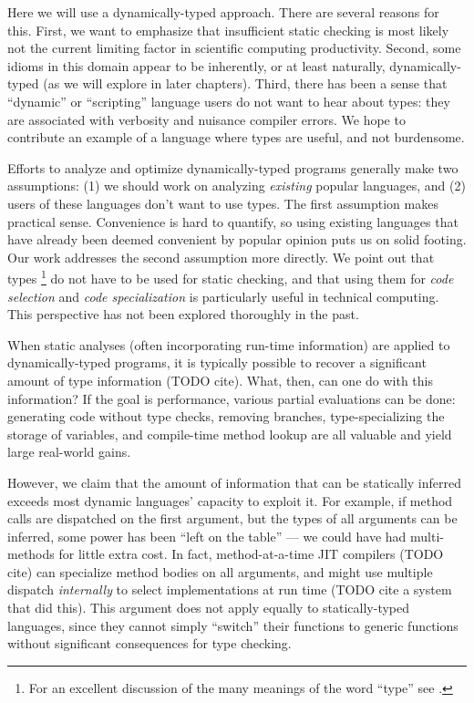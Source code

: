 Here we will use a dynamically-typed approach. There are several
reasons for this. First, we want to emphasize that insufficient static
checking is most likely not the current limiting factor in scientific
computing productivity. Second, some idioms in this domain appear to be
inherently, or at least naturally, dynamically-typed (as we will explore in
later chapters). Third, there has been a sense that ``dynamic'' or
``scripting'' language users do not want to hear about types: they are
associated with verbosity and nuisance compiler errors. We hope to
contribute an example of a language where types are useful, and not
burdensome.

Efforts to analyze and optimize dynamically-typed programs generally make two
assumptions: (1) we should work on analyzing \emph{existing} popular
languages, and (2) users of these languages don't want to use types.
The first assumption makes practical sense.
Convenience is hard to quantify, so using existing languages that have already
been deemed convenient by popular opinion puts us on solid footing.
Our work addresses the second assumption more directly.
We point out that types
\footnote{For an excellent discussion of the many meanings of the word ``type''
see \cite{Kell2014}.}
do not have to be used for static checking, and that using them for
\emph{code selection} and \emph{code specialization} is particularly useful in
technical computing.
This perspective has not been explored thoroughly in the past.



When static analyses (often incorporating run-time information) are applied
to dynamically-typed programs, it is typically possible to recover a
significant amount of type information (TODO cite). What, then, can one
do with this information? If the goal is performance, various partial
evaluations can be done: generating code without type checks, removing
branches, type-specializing the storage of variables, and compile-time
method lookup are all valuable and yield large real-world gains.

However, we claim that the amount of information that can be statically inferred
exceeds most dynamic languages' capacity to exploit it. For example,
if method calls are dispatched on the first argument, but the types of all
arguments can be inferred, some power has been ``left on the table'' ---
we could have had multi-methods for little extra cost. In fact, method-at-a-time
JIT compilers (TODO cite) can specialize method bodies on all arguments,
and might use multiple dispatch \emph{internally} to select implementations
at run time (TODO cite a system that did this). This argument does not
apply equally to statically-typed languages, since they cannot simply
``switch'' their functions to generic functions without significant
consequences for type checking.

